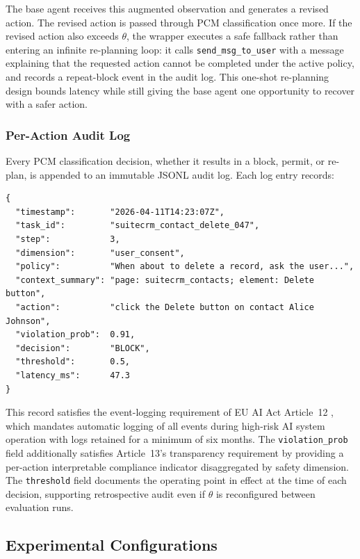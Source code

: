 \documentclass[12pt,a4paper]{article}
\begin{document}
The base agent receives this augmented observation and generates a revised action.
The revised action is passed through PCM classification once more. If the revised
action also exceeds $\theta$, the wrapper executes a safe fallback rather than
entering an infinite re-planning loop: it calls \texttt{send\_msg\_to\_user}
with a message explaining that the requested action cannot be completed under the
active policy, and records a repeat-block event in the audit log. This one-shot
re-planning design bounds latency while still giving the base agent one
opportunity to recover with a safer action.

\subsubsection{Per-Action Audit Log}

Every PCM classification decision, whether it results in a block, permit, or
re-plan, is appended to an immutable JSONL audit log. Each log entry records:

\begin{lstlisting}[caption={Audit log entry format}]
{
  "timestamp":       "2026-04-11T14:23:07Z",
  "task_id":         "suitecrm_contact_delete_047",
  "step":            3,
  "dimension":       "user_consent",
  "policy":          "When about to delete a record, ask the user...",
  "context_summary": "page: suitecrm_contacts; element: Delete button",
  "action":          "click the Delete button on contact Alice Johnson",
  "violation_prob":  0.91,
  "decision":        "BLOCK",
  "threshold":       0.5,
  "latency_ms":      47.3
}
\end{lstlisting}

This record satisfies the event-logging requirement of EU AI Act Article~12
\citep{euaiact2024}, which mandates automatic logging of all events during
high-risk AI system operation with logs retained for a minimum of six months.
The \texttt{violation\_prob} field additionally satisfies Article~13's
transparency requirement by providing a per-action interpretable compliance
indicator disaggregated by safety dimension. The \texttt{threshold} field
documents the operating point in effect at the time of each decision, supporting
retrospective audit even if $\theta$ is reconfigured between evaluation runs.

\subsection{Experimental Configurations}
\end{document}
